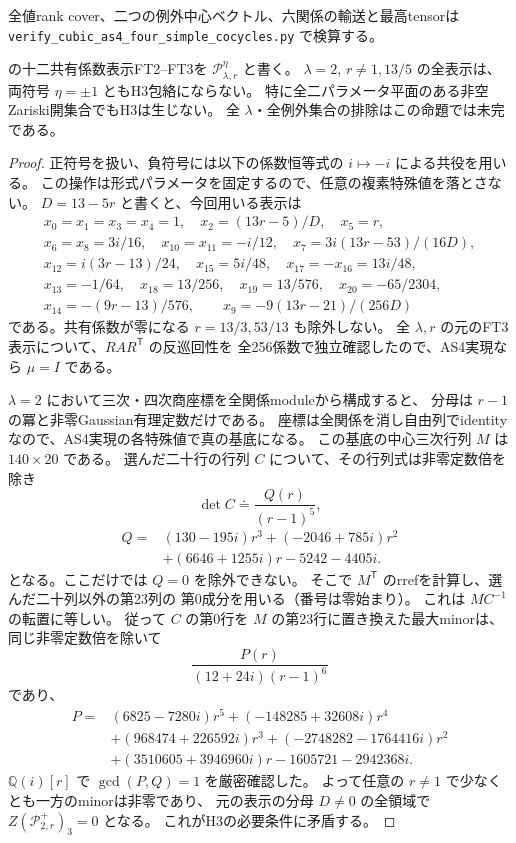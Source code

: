 全値rank cover、二つの例外中心ベクトル、六関係の輸送と最高tensorは
\texttt{verify\_\allowbreak{}cubic\_\allowbreak{}as4\_\allowbreak{}four\_\allowbreak{}simple\_\allowbreak{}cocycles.py} で検算する。

\begin{proposition}\label{prop:cubic-fs-p-slice}
\cite{AS4lowpinned}の十二共有係数表示FT2--FT3を
$\mathcal P^\eta_{\lambda,r}$ と書く。
$\lambda=2$, $r\ne1,13/5$ の全表示は、両符号 $\eta=\pm1$ ともH3包絡にならない。
特に全二パラメータ平面のある非空Zariski開集合でもH3は生じない。
全 $\lambda$・全例外集合の排除はこの命題では未完である。
\end{proposition}
\begin{proof}
正符号を扱い、負符号には以下の係数恒等式の $i\mapsto-i$ による共役を用いる。
この操作は形式パラメータを固定するので、任意の複素特殊値を落とさない。
$D=13-5r$ と書くと、今回用いる表示は
\[
\begin{gathered}
 x_0=x_1=x_3=x_4=1,\quad x_2=(13r-5)/D,\quad x_5=r,\\
 x_6=x_8=3i/16,\quad x_{10}=x_{11}=-i/12,\quad
 x_7=3i(13r-53)/(16D),\\
 x_{12}=i(3r-13)/24,\quad x_{15}=5i/48,\quad
 x_{17}=-x_{16}=13i/48,\\
 x_{13}=-1/64,\quad x_{18}=13/256,\quad x_{19}=13/576,\quad
 x_{20}=-65/2304,\\
 x_{14}=-(9r-13)/576,\qquad x_9=-9(13r-21)/(256D)
\end{gathered}
\]
である。共有係数が零になる $r=13/3,53/13$ も除外しない。
全 $\lambda,r$ の元のFT3表示について、$R A R^{\mathsf T}$ の反巡回性を
全256係数で独立確認したので、AS4実現なら $\mu=I$ である。

$\lambda=2$ において三次・四次商座標を全関係moduleから構成すると、
分母は $r-1$ の冪と非零Gaussian有理定数だけである。
座標は全関係を消し自由列でidentityなので、AS4実現の各特殊値で真の基底になる。
この基底の中心三次行列 $M$ は $140\times20$ である。
選んだ二十行の行列 $C$ について、その行列式は非零定数倍を除き
\[
 \det C\doteq\frac{Q(r)}{(r-1)^5},
\]
\begin{align*}
 Q={}&(130-195i)r^3+(-2046+785i)r^2\\
 &+(6646+1255i)r-5242-4405i.
\end{align*}
となる。ここだけでは $Q=0$ を除外できない。
そこで $M^{\mathsf T}$ のrrefを計算し、選んだ二十列以外の第23列の
第0成分を用いる（番号は零始まり）。
これは $M C^{-1}$ の転置に等しい。
従って $C$ の第0行を $M$ の第23行に置き換えた最大minorは、
同じ非零定数倍を除いて
\[
 \frac{P(r)}{(12+24i)(r-1)^6}
\]
であり、
\begin{align*}
 P={}&(6825-7280i)r^5+(-148285+32608i)r^4\\
 &+(968474+226592i)r^3+(-2748282-1764416i)r^2\\
 &+(3510605+3946960i)r-1605721-2942368i.
\end{align*}
$\mathbb Q(i)[r]$ で $\gcd(P,Q)=1$ を厳密確認した。
よって任意の $r\ne1$ で少なくとも一方のminorは非零であり、
元の表示の分母 $D\ne0$ の全領域で $Z(\mathcal P^+_{2,r})_3=0$ となる。
これがH3の必要条件に矛盾する。


\end{proof}

